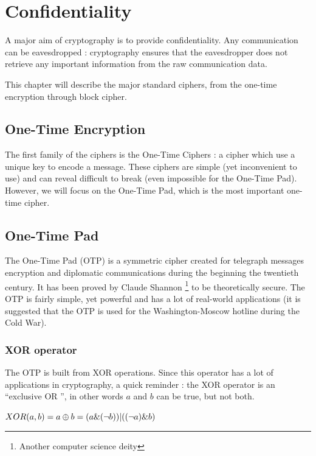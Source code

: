 \chapter{Confidentiality}

A major aim of cryptography is to provide confidentiality. Any communication can be eavesdropped : cryptography ensures that the eavesdropper does not retrieve any important information from the raw communication data.

This chapter will describe the major standard ciphers, from the one-time encryption through block cipher.

\section{One-Time Encryption}

The first family of the ciphers is the One-Time Ciphers : a cipher which use a unique key to encode a message. These ciphers are simple (yet inconvenient to use) and can reveal difficult to break (even impossible for the One-Time Pad). However, we will focus on the One-Time Pad, which is the most important one-time cipher. 

\section{One-Time Pad}

The One-Time Pad (OTP) is a symmetric cipher created for telegraph messages encryption and diplomatic communications during the beginning the twentieth century. It has been proved by Claude Shannon \footnote{Another computer science deity} to be theoretically secure. The OTP is fairly simple, yet powerful and has a lot of real-world applications (it is suggested that the OTP is used for the Washington-Moscow hotline during the Cold War).

\subsection{XOR operator}

The OTP is built from XOR operations. Since this operator has a lot of applications in cryptography, a quick reminder : the XOR operator is an ``exclusive OR '', in other words $a$ and $b$ can be true, but not both.


\begin{mydef}
\begin{minipage}[t]{0.8\textwidth}
\centering
    $XOR(a,b) = a \oplus b = (a\&(\lnot b)) | ((\lnot a)\&b)$
\end{minipage}
\end{mydef}

